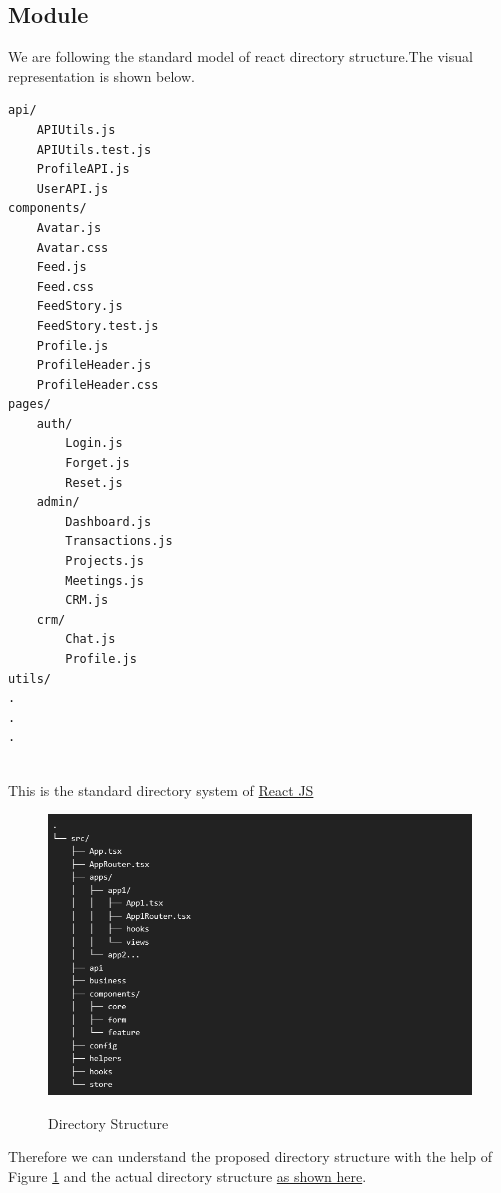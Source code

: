 \subsection{Module}
We are following the standard model of react directory structure.The visual representation is shown below.
\hypertarget{mylink}{}
\begin{verbatim}
api/
	APIUtils.js
	APIUtils.test.js
	ProfileAPI.js
	UserAPI.js
components/
	Avatar.js
	Avatar.css
	Feed.js
	Feed.css
	FeedStory.js
	FeedStory.test.js
	Profile.js
	ProfileHeader.js
	ProfileHeader.css
pages/
	auth/
		Login.js
		Forget.js
		Reset.js
	admin/
		Dashboard.js
		Transactions.js
		Projects.js
		Meetings.js
		CRM.js
	crm/
		Chat.js
		Profile.js
utils/
.
.
.
		
\end{verbatim}
This is the standard directory system of \href{https://bit.ly/3eIOaKZ}{React JS}
\begin{figure}[H]
	\begin{center}
		{\includegraphics[scale=0.5]{figures/web Concept/struct.png}}
		\caption{Directory Structure}
		\label{dir_str}
	\end{center}
\end{figure}
Therefore we can understand the proposed directory structure with the help of Figure \ref{dir_str} and the actual directory structure \hyperlink{mylink}{as shown here}.

\newpage

